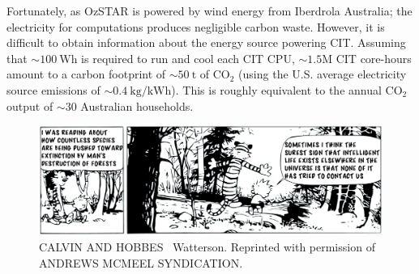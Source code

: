 Fortunately, as OzSTAR is powered by wind energy from Iberdrola Australia; the electricity for computations produces negligible carbon waste.
However, it is difficult to obtain information about the energy source powering CIT.
Assuming that ${\sim100\ \text{Wh}}$ is required to run and cool each CIT CPU, $\sim1.5\mathrm{M}$ CIT core-hours amount to a carbon footprint of ${\sim50\ \mathrm{t}}$ of ${\text{CO}_2}$ (using the U.S. average electricity source emissions of ${\sim0.4\ \text{kg/kWh}}$).
This is roughly equivalent to the annual ${\text{CO}_2}$  output of $\sim30$ Australian households.










\begin{figure}
\begin{center}
\centerline{\includegraphics[width=1\linewidth]{figures/calvin_and_hobbes_2.png}}
  \caption*{\tiny CALVIN AND HOBBES \textcopyright\  Watterson. Reprinted with permission of ANDREWS MCMEEL SYNDICATION.}
\end{center}
\end{figure}